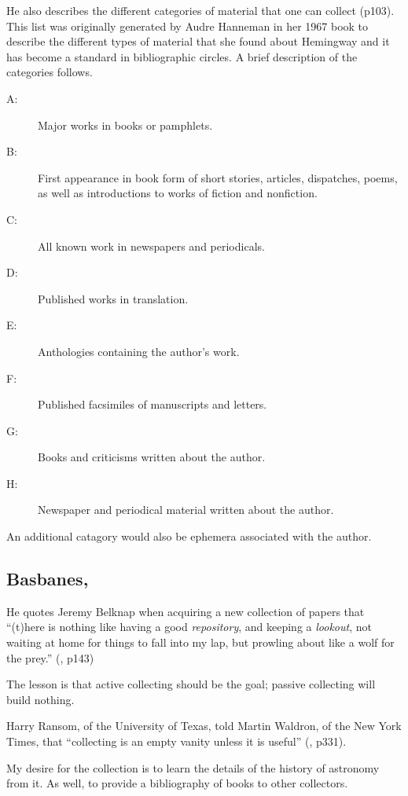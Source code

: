 \documentclass[letterpaper]{article}
\begin{document}
He also describes the different categories of material that one can
collect (p103).  This list was originally generated by Audre Hanneman
in her 1967 book 
to describe the different types of material that she found about
Hemingway and it has become a standard in bibliographic circles.
A brief description of the categories follows.

\begin{description}
\item[A:] Major works in books or pamphlets.
\item[B:] First appearance in book form of short stories, articles,
  dispatches, poems, as well as introductions to works of fiction
  and nonfiction.
\item[C:] All known work in newspapers and periodicals.
\item[D:] Published works in translation.
\item[E:] Anthologies containing the author's work.
\item[F:] Published facsimiles of manuscripts and letters.
\item[G:] Books and criticisms written about the author.
\item[H:] Newspaper and periodical material written about the author.
\end{description}

An additional catagory would also be ephemera associated with
the author.

\subsection{Basbanes, }

He quotes Jeremy Belknap when acquiring a new collection of papers
that ``(t)here is nothing like having a good {\itshape repository},
and keeping a {\itshape lookout}, not waiting at home for things to
fall into my lap, but prowling about like a wolf for the prey.''
(\cite{Basbanes1999}, p143)

The lesson is that active collecting should be the goal; passive
collecting will build nothing.

Harry Ransom, of the University of Texas, told Martin Waldron, of
the New York Times, that ``collecting is an empty vanity unless
it is useful'' (\cite{Basbanes1999}, p331).

My desire for the collection is to learn the details of the history
of astronomy from it. As well, to provide a bibliography of books
to other collectors.
\end{document}
